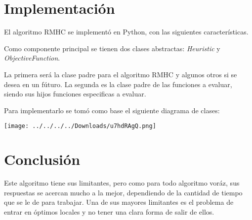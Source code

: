 \documentclass[10pt]{report}
\begin{document}
\section*{Implementación}

El algoritmo RMHC se implementó en Python, con las siguientes características.

Como componente principal se tienen dos clases abstractas: \textit{Heuristic} y \textit{ObjectiveFunction}.

La primera será la clase padre para el algoritmo RMHC y algunos otros si se desea en un fúturo. La segunda es la clase padre de las funciones a evaluar, siendo sus hijos funciones especificas a evaluar.

Para implementarlo se tomó como base el siguiente diagrama de clases:

\begin{center}\texttt{[image: ../../../../Downloads/u7hdRAgQ.png]}\end{center}

\section*{Conclusión}

Este algoritmo tiene sus limitantes, pero como para todo algoritmo voráz, sus respuestas se acercan mucho a la mejor, dependiendo de la cantidad de tiempo que se le de para trabajar. Una de sus mayores limitantes es el problema de entrar en óptimos locales y no tener una clara forma de salir de ellos.
\end{document}
